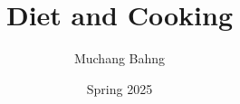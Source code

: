 \documentclass{article}
\begin{document}
\title{Diet and Cooking}
\author{Muchang Bahng}
\date{Spring 2025}

\maketitle

 
 
 
 
\end{document}
